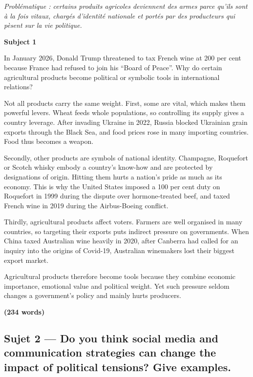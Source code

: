 \documentclass[11pt,a4paper]{article}
\begin{document}
\emph{Problématique : certains produits agricoles deviennent des armes parce qu'ils sont à la fois vitaux, chargés d'identité nationale et portés par des producteurs qui pèsent sur la vie politique.}

\textbf{Subject 1}

In January 2026, Donald Trump threatened to tax French wine at 200 per cent because France had refused to join his ``Board of Peace''. Why do certain agricultural products become political or symbolic tools in international relations?

Not all products carry the same weight. First, some are vital, which makes them powerful levers. Wheat feeds whole populations, so controlling its supply gives a country leverage. After invading Ukraine in 2022, Russia blocked Ukrainian grain exports through the Black Sea, and food prices rose in many importing countries. Food thus becomes a weapon.

Secondly, other products are symbols of national identity. Champagne, Roquefort or Scotch whisky embody a country's know-how and are protected by designations of origin. Hitting them hurts a nation's pride as much as its economy. This is why the United States imposed a 100 per cent duty on Roquefort in 1999 during the dispute over hormone-treated beef, and taxed French wine in 2019 during the Airbus-Boeing conflict.

Thirdly, agricultural products affect voters. Farmers are well organised in many countries, so targeting their exports puts indirect pressure on governments. When China taxed Australian wine heavily in 2020, after Canberra had called for an inquiry into the origins of Covid-19, Australian winemakers lost their biggest export market.

Agricultural products therefore become tools because they combine economic importance, emotional value and political weight. Yet such pressure seldom changes a government's policy and mainly hurts producers.

\textbf{(234 words)}

\hypertarget{sujet-2-do-you-think-social-media-and-communication-strategies-can-change-the-impact-of-political-tensions-give-examples.}{%
\subsection{Sujet 2 --- Do you think social media and communication strategies can change the impact of political tensions? Give examples.}\label{sujet-2-do-you-think-social-media-and-communication-strategies-can-change-the-impact-of-political-tensions-give-examples.}}
\end{document}
